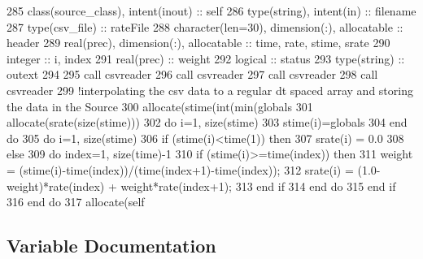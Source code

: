\begin{DoxyCode}
285     \textcolor{keywordtype}{class}(source\_class), \textcolor{keywordtype}{intent(inout)} :: self
286     \textcolor{keywordtype}{type}(string), \textcolor{keywordtype}{intent(in)} :: filename
287     \textcolor{keywordtype}{type}(csv\_file) :: rateFile
288     \textcolor{keywordtype}{character(len=30)}, \textcolor{keywordtype}{dimension(:)}, \textcolor{keywordtype}{allocatable} :: header
289     \textcolor{keywordtype}{real(prec)}, \textcolor{keywordtype}{dimension(:)}, \textcolor{keywordtype}{allocatable} :: time, rate, stime, srate
290     \textcolor{keywordtype}{integer} :: i, index
291     \textcolor{keywordtype}{real(prec)} :: weight
292     \textcolor{keywordtype}{logical} :: status
293     \textcolor{keywordtype}{type}(string) :: outext
294 
295     \textcolor{keyword}{call }csvreader%
296     \textcolor{keyword}{call }csvreader%
297     \textcolor{keyword}{call }csvreader%
298     \textcolor{keyword}{call }csvreader%
299     \textcolor{comment}{!interpolating the csv data to a regular dt spaced array and storing the data in the Source}
300     \textcolor{keyword}{allocate}(stime(int(min(globals%
301     \textcolor{keyword}{allocate}(srate(\textcolor{keyword}{size}(stime)))
302     \textcolor{keywordflow}{do} i=1, \textcolor{keyword}{size}(stime)
303         stime(i)=globals%
304 \textcolor{keywordflow}{    end do}
305     \textcolor{keywordflow}{do} i=1, \textcolor{keyword}{size}(stime)
306         \textcolor{keywordflow}{if} (stime(i)<time(1)) \textcolor{keywordflow}{then} 
307             srate(i) = 0.0
308         \textcolor{keywordflow}{else}
309             \textcolor{keywordflow}{do} index=1, \textcolor{keyword}{size}(time)-1
310                 \textcolor{keywordflow}{if} (stime(i)>=time(index)) \textcolor{keywordflow}{then}
311                     weight = (stime(i)-time(index))/(time(index+1)-time(index));
312                     srate(i) = (1.0-weight)*rate(index) + weight*rate(index+1);
313 \textcolor{keywordflow}{                end if}
314 \textcolor{keywordflow}{            end do}
315 \textcolor{keywordflow}{        end if}
316 \textcolor{keywordflow}{    end do}
317     \textcolor{keyword}{allocate}(self%
\end{DoxyCode}


\subsection{Variable Documentation}
\mbox{\label{namespacesources__mod_ab04ea8c02cdf83a1a356c8710ae811d5}} 
